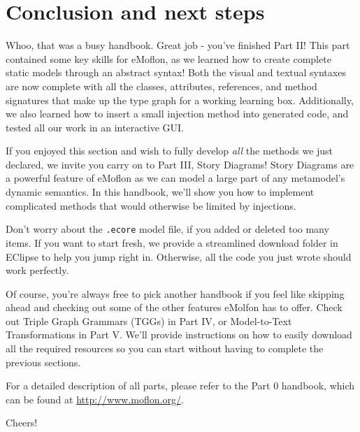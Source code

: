 \newpage
\section{Conclusion and next steps}
\genHeader
\hypertarget{conclusion}{}

\vspace{0.5cm}

Whoo, that was a busy handbook. Great job - you've finished Part II! This part contained some key skills for eMoflon, as we learned how to create complete
static models through an abstract syntax! Both the visual and textual syntaxes are now complete with all the classes, attributes, references, and
method signatures that make up the type graph for a working learning box. Additionally, we also learned how to insert a small injection method into generated
code, and tested all our work in an interactive GUI.

If you enjoyed this section and wish to fully develop \emph{all} the methods we just declared, we invite you carry on to Part III, Story
Diagrams! Story Diagrams are a powerful feature of eMoflon as we can model a large part of any metamodel's dynamic semantics. In this handbook, we'll show you
how to implement complicated methods that would otherwise be limited by injections.

Don't worry about the \texttt{.ecore} model file, if you added or deleted too many items. If you want to start fresh, we provide a streamlined download folder
in EClipse to help you jump right in. Otherwise, all the code you just wrote should work perfectly.

Of course, you're always free to pick another handbook if you feel like skipping ahead and checking out some of the other features eMolfon has to offer. Check
out Triple Graph Grammars (TGGs)  in Part IV, or Model-to-Text Transformations in Part V. We'll provide instructions on how to easily download all the
required resources so you can start without having to complete the previous sections.

For a detailed description of all parts, please refer to the Part 0 handbook, which can be found at \href{http://www.moflon.org/ }{http://www.moflon.org/}.

\vspace{1.0cm}

Cheers!
